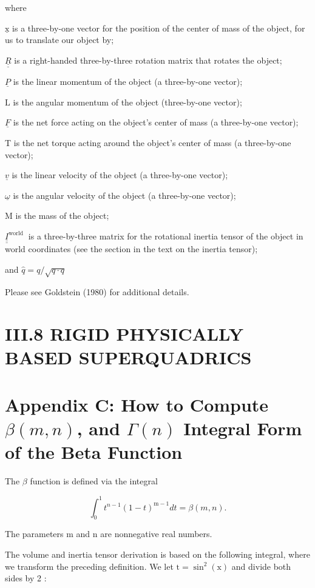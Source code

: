 where

$\underline{\mathrm{x}}$ is a three-by-one vector for the position of the center of mass of the object, for us to translate our object by;

$\underline{\underline{R}}$ is a right-handed three-by-three rotation matrix that rotates the object;

$\underline{P}$ is the linear momentum of the object (a three-by-one vector);

$\mathrm{L}$ is the angular momentum of the object (three-by-one vector);

$\underline{F}$ is the net force acting on the object's center of mass (a three-by-one vector);

T is the net torque acting around the object's center of mass (a three-by-one vector);

$\underline{v}$ is the linear velocity of the object (a three-by-one vector);

$\underline{\omega}$ is the angular velocity of the object (a three-by-one vector);

$\mathrm{M}$ is the mass of the object;

$\underline{\underline{I}}^{\text {world }}$ is a three-by-three matrix for the rotational inertia tensor of the object in world coordinates (see the section in the text on the inertia tensor);

and $\hat{q}=q / \sqrt{q \cdot q}$

Please see Goldstein (1980) for additional details.

\section{III.8 RIGID PHYSICALLY BASED SUPERQUADRICS}
\section{Appendix C: How to Compute $\beta(m, n)$, and $\Gamma(n)$ 
 Integral Form of the Beta Function}
The $\beta$ function is defined via the integral

$$
\int_{0}^{1} t^{n-1}(1-t)^{\mathrm{m}-1} d t=\beta(m, n) .
$$

The parameters $\mathrm{m}$ and $\mathrm{n}$ are nonnegative real numbers.

The volume and inertia tensor derivation is based on the following integral, where we transform the preceding definition. We let $\mathrm{t}=\sin ^{2}(\mathrm{x})$ and divide both sides by 2 :

